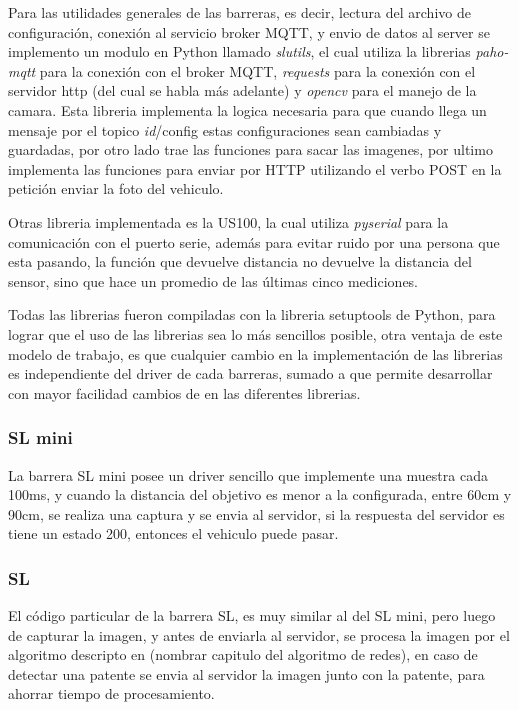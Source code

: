 Para las utilidades generales de las barreras, es decir, lectura del archivo de configuración, conexión al servicio broker MQTT, y envio de datos al server se implemento un modulo en Python llamado \textit{slutils}, el cual utiliza la librerias \textit{paho-mqtt} para la conexión con el broker MQTT, \textit{requests} para la conexión con el servidor http (del cual se habla más adelante) y \textit{opencv} para el manejo de la camara. Esta libreria implementa la logica necesaria para que cuando llega un mensaje por el topico \textit{id}/config estas configuraciones sean cambiadas y guardadas, por otro lado trae las funciones para sacar las imagenes, por ultimo implementa las funciones para enviar por HTTP utilizando el verbo POST en la petición enviar la foto del vehiculo.

Otras libreria implementada es la US100, la cual utiliza \textit{pyserial} para la comunicación con el puerto serie, además para evitar ruido por una persona que esta pasando, la función que devuelve distancia no devuelve la distancia del sensor, sino que hace un promedio de las últimas cinco mediciones.

Todas las librerias fueron compiladas con la libreria setuptools de Python, para lograr que el uso de las librerias sea lo más sencillos posible, otra ventaja de este modelo de trabajo, es que cualquier cambio en la implementación de las librerias es independiente del driver de cada barreras, sumado a que permite desarrollar con mayor facilidad cambios de en las diferentes librerias.

\subsubsection{SL mini}

La barrera SL mini posee un driver sencillo que implemente una muestra cada 100ms, y cuando la distancia del objetivo es menor a la configurada, entre 60cm y 90cm, se realiza una captura y se envia al servidor, si la respuesta del servidor es tiene un estado 200, entonces el vehiculo puede pasar.

\subsubsection{SL}

El código particular de la barrera SL, es muy similar al del SL mini, pero luego de capturar la imagen, y antes de enviarla al servidor, se procesa la imagen por el algoritmo descripto en (nombrar capitulo del algoritmo de redes), en caso de detectar una patente se envia al servidor la imagen junto con la patente, para ahorrar tiempo de procesamiento.


